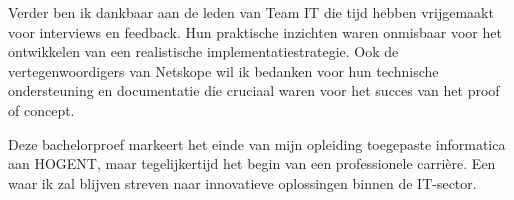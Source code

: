 \vspace{2ex}

Verder ben ik dankbaar aan de leden van Team IT die tijd hebben vrijgemaakt voor interviews en feedback. Hun praktische inzichten waren onmisbaar voor het ontwikkelen van een realistische implementatiestrategie. Ook de vertegenwoordigers van Netskope wil ik bedanken voor hun technische ondersteuning en documentatie die cruciaal waren voor het succes van het proof of concept.

\vspace{2ex}

Deze bachelorproef markeert het einde van mijn opleiding toegepaste informatica aan HOGENT, maar tegelijkertijd het begin van een professionele carrière. Een waar ik zal blijven streven naar innovatieve oplossingen binnen de IT-sector.
